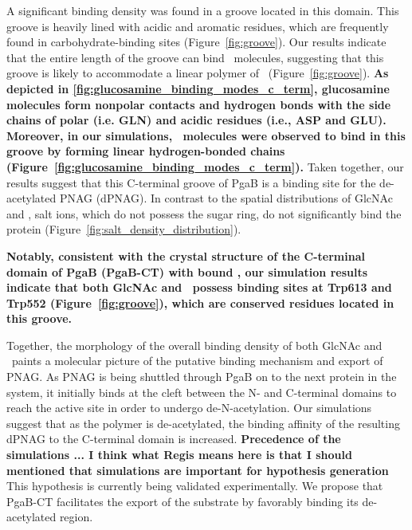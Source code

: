 A significant binding density was found in a groove located in this domain.  This groove is heavily lined with acidic and aromatic residues, which are frequently found in carbohydrate-binding sites (Figure~\ref{fig:groove}). Our results indicate that the entire length of the groove can bind \glucosamine\ molecules, suggesting that this groove is likely to accommodate a linear polymer of \glucosamine\ (Figure~\ref{fig:groove}). \textbf{As depicted in \ref{fig:glucosamine_binding_modes_c_term}, glucosamine molecules form nonpolar contacts and hydrogen bonds with the side chains of polar (i.e. GLN) and acidic residues (i.e., ASP and GLU).  Moreover, in our simulations, \glucosamine\ molecules were observed to bind in this groove by forming linear hydrogen-bonded chains (Figure~\ref{fig:glucosamine_binding_modes_c_term}).} Taken together, our results suggest that this C-terminal groove of PgaB is a binding site for the de-acetylated PNAG (dPNAG). In contrast to the spatial distributions of GlcNAc and \glucosamine, salt ions, which do not possess the sugar ring, do not significantly bind the protein (Figure~\ref{fig:salt_density_distribution}).

\textbf{Notably, consistent with the crystal structure of the C-terminal domain of PgaB (PgaB-CT) with bound \glucosamine, our simulation results indicate that both GlcNAc and \glucosamine\ possess binding sites at Trp613 and Trp552 (Figure~\ref{fig:groove}), which are conserved residues located in this groove.\cite{Little:2012dp}}

Together, the morphology of the overall binding density of both GlcNAc and \glucosamine\ paints a molecular picture of the putative binding mechanism and export of PNAG. As PNAG is being shuttled through PgaB on to the next protein in the system, it initially binds at the cleft between the N- and C-terminal domains to reach the active site in order to undergo de-N-acetylation. Our simulations suggest that as the polymer is de-acetylated, the binding affinity of the resulting dPNAG to the C-terminal domain is increased. \textbf{Precedence of the simulations ... I think what Regis means here is that I should mentioned that simulations are important for hypothesis generation} This hypothesis is currently being validated experimentally. We propose that PgaB-CT facilitates the export of the substrate by favorably binding its de-acetylated region. 

 
